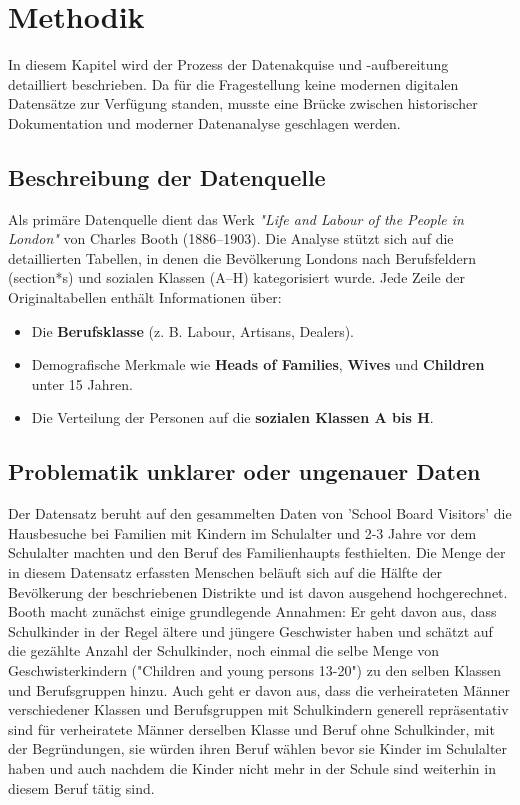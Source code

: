 \chapter{Methodik}
\label{chap:methodik}

In diesem Kapitel wird der Prozess der Datenakquise und -aufbereitung detailliert beschrieben. Da für die Fragestellung keine modernen digitalen Datensätze zur Verfügung standen, musste eine Brücke zwischen historischer Dokumentation und moderner Datenanalyse geschlagen werden.

\section*{Beschreibung der Datenquelle}
Als primäre Datenquelle dient das Werk \textit{"Life and Labour of the People in London"} von Charles Booth (1886--1903). Die Analyse stützt sich auf die detaillierten Tabellen, in denen die Bevölkerung Londons nach Berufsfeldern (section*s) und sozialen Klassen (A--H) kategorisiert wurde. Jede Zeile der Originaltabellen enthält Informationen über:
\begin{itemize}
    \item Die \textbf{Berufsklasse} (z. B. Labour, Artisans, Dealers).
    \item Demografische Merkmale wie \textbf{Heads of Families}, \textbf{Wives} und \textbf{Children} unter 15 Jahren.
    \item Die Verteilung der Personen auf die \textbf{sozialen Klassen A bis H}.
\end{itemize}

\section*{Problematik unklarer oder ungenauer Daten}
Der Datensatz beruht auf den gesammelten Daten von 'School Board Visitors' die Hausbesuche bei Familien mit Kindern im Schulalter und 2-3 Jahre vor dem Schulalter machten und den Beruf des Familienhaupts festhielten. Die Menge der in diesem Datensatz erfassten Menschen beläuft sich auf die Hälfte der Bevölkerung der beschriebenen Distrikte und ist davon ausgehend hochgerechnet.
Booth macht zunächst einige grundlegende Annahmen:
Er geht davon aus, dass Schulkinder in der Regel ältere und jüngere Geschwister haben und schätzt auf die gezählte Anzahl der Schulkinder, noch einmal die selbe Menge von Geschwisterkindern ("Children and young persons 13-20") zu den selben Klassen und Berufsgruppen hinzu.
Auch geht er davon aus, dass die verheirateten Männer verschiedener Klassen und Berufsgruppen mit Schulkindern generell repräsentativ sind für verheiratete Männer derselben Klasse und Beruf ohne Schulkinder, mit der Begründungen, sie würden ihren Beruf wählen bevor sie Kinder im Schulalter haben und auch nachdem die Kinder nicht mehr in der Schule sind weiterhin in diesem Beruf tätig sind.

